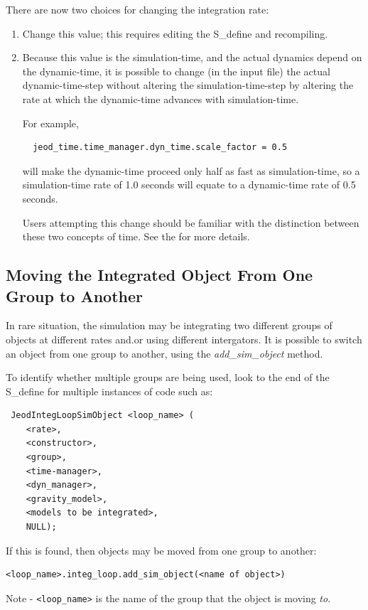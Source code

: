 There are now two choices for changing the integration rate:
\begin{enumerate}
 \item Change this value; this requires editing the S\_define and recompiling.
 \item Because this value is the simulation-time, and the actual dynamics 
 depend on the dynamic-time, it is possible to change (in the input file) the 
 actual dynamic-time-step without altering the simulation-time-step by 
 altering the rate at which the dynamic-time advances with simulation-time.
 
 For example,
 \begin{verbatim}
  jeod_time.time_manager.dyn_time.scale_factor = 0.5
 \end{verbatim}
 will make the dynamic-time proceed only half as fast as simulation-time, so a 
 simulation-time rate of 1.0 seconds will equate to a dynamic-time rate of 0.5 
 seconds.
 
 Users attempting this change should be familiar with the distinction between 
 these two concepts of time. See the  for more details.
 

\end{enumerate}

\subsection{Moving the Integrated Object From One Group to Another}
In rare situation, the simulation may be integrating two different groups of 
objects at different rates and.or using different intergators.  It is possible 
to switch an object from one group to another, using the 
\textit{add\_sim\_object} method.

To identify whether multiple groups are being used, look to the end of the 
S\_define for multiple instances of code such as:
\begin{verbatim}
 JeodIntegLoopSimObject <loop_name> (
    <rate>, 
    <constructor>, 
    <group>, 
    <time-manager>, 
    <dyn_manager>, 
    <gravity_model>,
    <models to be integrated>,
    NULL);
\end{verbatim}

If this is found, then objects may be moved from one group to another:
\begin{verbatim}
<loop_name>.integ_loop.add_sim_object(<name of object>) 
\end{verbatim}
Note - \verb+<loop_name>+ is the name of the group that the object is moving 
\textit{to}.


